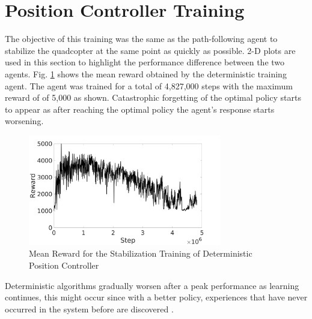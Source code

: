 \section{Position Controller Training}
The objective of this training was the same as the path-following agent to stabilize the quadcopter at the same point as quickly as possible. 2-D plots are used in this section to highlight the performance difference between the two agents. Fig. \ref{deterministic trainingrew} shows the mean reward obtained by the deterministic training agent. The agent was trained for a total of 4,827,000 steps with the maximum reward  of of 5,000 as shown. Catastrophic forgetting of the optimal policy starts to appear as after reaching the optimal policy the agent's response starts worsening.
    \begin{figure}[H]
            \centering
            \includegraphics[width=0.75\textwidth]{plots/td3_rew.jpg}
            \caption{Mean Reward for the Stabilization Training of Deterministic Position Controller}
            \label{deterministic trainingrew}
    \end{figure}
    Deterministic algorithms gradually worsen after a peak performance as learning continues, this might occur since with a better policy, experiences that have never occurred in the system before are discovered \cite{lu2020adaptive}.
    
